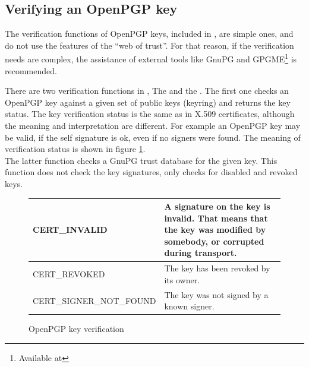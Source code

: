 \subsection*{Verifying an OpenPGP key}
The verification functions of OpenPGP keys, included in \gnutls{}, 
are simple ones, and do not use the features of the ``web of trust''.
For that reason, if the verification needs are complex, 
the assistance of external tools like GnuPG and GPGME\footnote{
Available at }
is recommended.
\par
There are two verification functions in \gnutls{},
The 
and the . 
The first one checks an OpenPGP key against a given set of public keys (keyring) and
returns the key status. The key verification status is the same as in X.509 certificates,
although the meaning and interpretation are different. For example an OpenPGP key may
be valid, if the self signature is ok, even if no signers were found.
The meaning of verification status is shown in figure \ref{fig:pgp_verify}.
\\
The latter function checks a GnuPG trust database for the given key. This function does not
check the key signatures, only checks for disabled and revoked keys.

\begin{figure}[hbtp]
\begin{tabular}{|l|p{7cm}|}

\hline
CERT\_INVALID & A signature on the key is invalid. That means that the key was modified
by somebody, or corrupted during transport.
\\
\hline
CERT\_REVOKED & The key has been revoked by its owner.
\\
\hline
CERT\_SIGNER\_NOT\_FOUND & The key was not signed by a known signer.
\\
\hline
\end{tabular}
\caption{OpenPGP key verification}
\label{fig:pgp_verify}
\end{figure}

